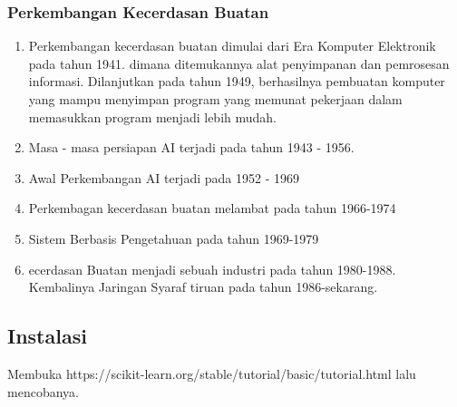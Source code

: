             \subsubsection{Perkembangan Kecerdasan Buatan}
            \begin{enumerate}
                \item Perkembangan kecerdasan buatan dimulai dari Era Komputer Elektronik pada tahun 1941. dimana ditemukannya alat penyimpanan dan pemrosesan informasi. Dilanjutkan pada tahun 1949, berhasilnya pembuatan komputer yang mampu menyimpan program yang memunat pekerjaan dalam memasukkan program menjadi lebih mudah.
                \item Masa - masa persiapan AI terjadi pada tahun 1943 - 1956.
                \item Awal Perkembangan AI terjadi pada 1952 - 1969
                \item Perkembagan kecerdasan buatan melambat pada tahun 1966-1974
                \item Sistem Berbasis Pengetahuan pada tahun 1969-1979
                \item ecerdasan Buatan menjadi sebuah industri pada tahun 1980-1988. Kembalinya Jaringan Syaraf tiruan pada tahun 1986-sekarang.
            \end{enumerate}
        \subsection{Instalasi}
            Membuka  https://scikit-learn.org/stable/tutorial/basic/tutorial.html lalu mencobanya.
